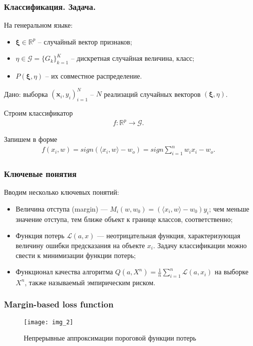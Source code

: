 \documentclass[11pt]{beamer}
\begin{document}
	\begin{frame}
		\frametitle{Классификация. Задача.}
	
	На генеральном языке:
	\begin{itemize}
		\item $\boldsymbol{\xi} \in \mathbb{R}^p$ -- случайный вектор признаков;
		\item $\eta \in \mathcal{G} = \{G_k\}_{k = 1}^K$ -- дискретная случайная величина, класс;
		\item $P(\boldsymbol{\xi}, \eta)$ -- их совместное распределение.
	\end{itemize}
	\bigskip
	Дано: выборка $(\mathbf{x}_i, y_i)_{i = 1}^N$ -- $N$ реализаций случайных векторов $(\boldsymbol{\xi}, \eta)$.
	
	\bigskip
	Строим классификатор
	\begin{eqnarray}\label{Base}  
		f : \mathbb{R}^p \rightarrow \mathcal{G}. 
	\end{eqnarray}
	
	Запишем в форме
	\begin{eqnarray}\label{Base_2}  
		f (x_i, w) = sign (\langle x_i, w \rangle - w_o) = sign \sum_{i=1}^{n} w_i x_i - w_o.
	\end{eqnarray}
	\end{frame}

	\begin{frame}
	\frametitle{Ключевые понятия}
	
	Вводим несколько ключевых понятий:
	
	\begin{itemize}
		\item Величина отступа (margin) --- $M_i (w, w_0) = (\langle x_i, w \rangle - w_0) y_i$; чем меньше значение отступа, тем ближе объект к границе классов, соответственно;
		\item Функция потерь $\mathcal{L} (a, x)$ --- неотрицательная функция, характеризующая величину ошибки предсказания на объекте $x_i$. Задачу классификации можно свести к минимизации функции потерь;
		\item Функционал качества алгоритма $Q(a, X^n) = \frac{1}{n} \sum_{i = 1}^n \mathcal{L} (a, x_i)$ на выборке $X^n$, также называемый эмпирическим риском.
	\end{itemize} 
	\end{frame}

	\begin{frame}
	\frametitle{Margin-based loss function}
	
	\begin{figure}
		\texttt{[image: img\_2]}
		\caption{Непрерывные аппроксимации пороговой функции потерь}
		\label{1}
	\end{figure}
	
	\end{frame}
\end{document}
